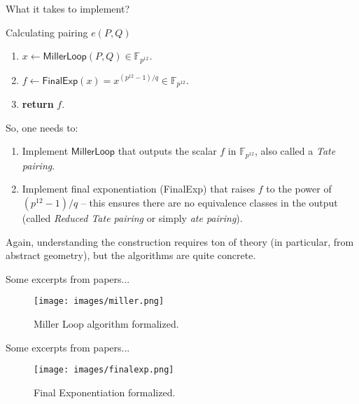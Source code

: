 \documentclass[xcolor={usenames,dvipsnames}]{beamer}
\begin{document}
    \begin{frame}{What it takes to implement?}
        \begin{block}{Calculating pairing $e(P,Q)$}
        \begin{enumerate}
            \item $x \gets \mathsf{MillerLoop}(P,Q) \in \mathbb{F}_{p^{12}}$.
            \item $f \gets \mathsf{FinalExp}(x) = x^{(p^{12}-1)/q} \in \mathbb{F}_{p^{12}}$.
            \item \textbf{return} $f$.
        \end{enumerate}
        \end{block}

        So, one needs to:
        \begin{enumerate}
            \item Implement $\mathsf{MillerLoop}$ that outputs the scalar $f$ in $\mathbb{F}_{p^{12}}$, also called a \textit{Tate pairing}.\pause
            \item Implement final exponentiation (\textsf{FinalExp}) that raises $f$ to the power of $(p^{12}-1)/q$ -- this ensures there are no equivalence classes in the output (called \textit{Reduced Tate pairing} or simply \textit{ate pairing}).\pause
        \end{enumerate}

        Again, understanding the construction requires ton of theory (in particular, from abstract geometry), but the algorithms are quite concrete.
    \end{frame}

    \begin{frame}{Some excerpts from papers...}
        \begin{figure}
            \centering
            \texttt{[image: images/miller.png]}
            \caption{Miller Loop algorithm formalized.}
        \end{figure}
    \end{frame}

    \begin{frame}{Some excerpts from papers...}
        \begin{figure}
            \centering
            \texttt{[image: images/finalexp.png]}
            \caption{Final Exponentiation formalized.}
        \end{figure}
    \end{frame}
\end{document}

